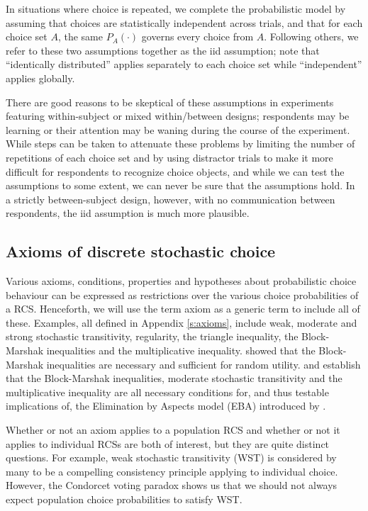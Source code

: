 \documentclass[11pt,letter]{article}
\begin{document}
In situations where choice is repeated, we complete the probabilistic model by assuming that choices are statistically independent across trials, and that for each choice set $A$, the same $P_A(\cdot)$ governs every choice from $A$.
Following others, we refer to these two assumptions together as the iid assumption; note that ``identically distributed'' applies separately to each choice set while ``independent'' applies globally.

There are good reasons to be skeptical of these assumptions in experiments featuring within-subject or mixed within/between designs; respondents may be learning or their attention may be waning during the course of the experiment.
While steps can be taken to attenuate these problems by limiting the number of repetitions of each choice set and by using distractor trials to make it more difficult for respondents to recognize choice objects, and while we can test the assumptions to some extent, we can never be sure that the assumptions hold.
In a strictly between-subject design, however, with no communication between respondents, the iid assumption is much more plausible.

\subsection{Axioms of discrete stochastic choice}

Various axioms, conditions, properties and hypotheses about probabilistic choice behaviour can be expressed as restrictions over the various choice probabilities of a RCS.
Henceforth, we will use the term axiom as a generic term to include all of these.
Examples, all defined in Appendix \ref{s:axioms}, include weak, moderate and strong stochastic transitivity, regularity, the triangle inequality, the Block-Marshak inequalities and the multiplicative inequality.
 showed that the Block-Marshak inequalities are necessary and sufficient for random utility.
 and  establish that the Block-Marshak inequalities, moderate stochastic transitivity and the multiplicative inequality are all necessary conditions for, and thus testable implications of, the Elimination by Aspects model (EBA) introduced by .

Whether or not an axiom applies to a population RCS and whether or not it applies to individual RCSs are both of interest, but they are quite distinct questions.
For example, weak stochastic transitivity (WST) is considered by many to be a compelling consistency principle applying to individual choice.
However, the Condorcet voting paradox shows us that we should not always expect population choice probabilities to satisfy WST.
\end{document}
